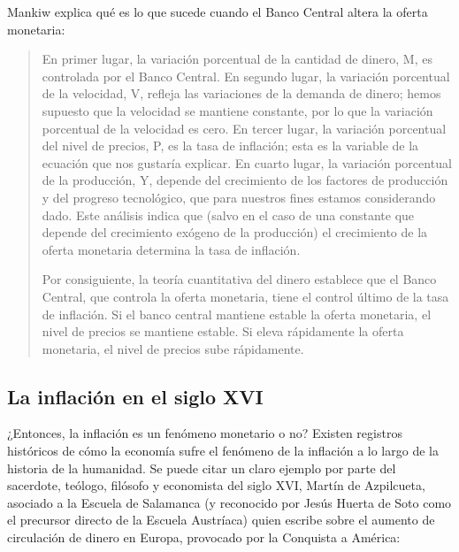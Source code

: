 \documentclass[12pt,a4paper,twoside]{book}
\begin{document}
Mankiw explica qué es lo que sucede cuando el Banco Central altera la oferta monetaria:

\begin{quotation}
En primer lugar, la variación porcentual de la cantidad de dinero, M, es controlada por el Banco Central. En segundo lugar, la variación porcentual de la velocidad, V, refleja las variaciones de la demanda de dinero; hemos supuesto que la velocidad se mantiene constante, por lo que la variación porcentual de la velocidad es cero. En tercer lugar, la variación porcentual del nivel de precios, P, es la tasa de inflación; esta es la variable de la ecuación que nos gustaría explicar. En cuarto lugar, la variación porcentual de la producción, Y, depende del crecimiento de los factores de producción y del progreso tecnológico, que para nuestros fines estamos considerando dado. Este análisis indica que (salvo en el caso de una constante que depende del crecimiento exógeno de la producción) el crecimiento de la oferta monetaria determina la tasa de inflación.

Por consiguiente, la teoría cuantitativa del dinero establece que el Banco Central, que controla la oferta monetaria, tiene el control último de la tasa de inflación. Si el banco central mantiene estable la oferta monetaria, el nivel de precios se mantiene estable. Si eleva rápidamente la oferta monetaria, el nivel de precios sube rápidamente. \cite[págs. 179-180]{mankiw}
\end{quotation}

\subsection{La inflación en el siglo XVI}
¿Entonces, la inflación es un fenómeno monetario o no? Existen registros históricos de cómo la economía sufre el fenómeno de la inflación a lo largo de la historia de la humanidad. Se puede citar un claro ejemplo por parte del sacerdote, teólogo, filósofo y economista del siglo XVI, Martín de Azpilcueta, asociado a la Escuela de Salamanca (y reconocido por Jesús Huerta de Soto como el precursor directo de la Escuela Austríaca) quien escribe sobre el aumento de circulación de dinero en Europa, provocado por la Conquista a América:
\end{document}
